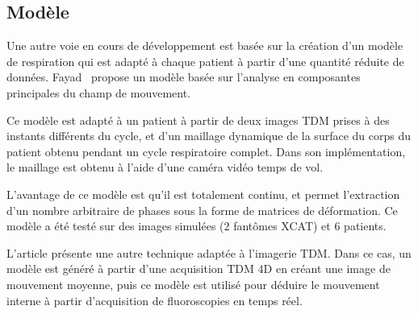 \subsection{Modèle}

Une autre voie en cours de développement est basée sur la création d'un modèle de respiration qui est adapté à chaque patient à partir d'une quantité réduite de données. Fayad~\cite{fayad2010application} propose un modèle basée sur l'analyse en composantes principales du champ de mouvement. 

Ce modèle est adapté à un patient à partir de deux images TDM prises à des instants différents du cycle, et d'un maillage dynamique de la surface du corps du patient obtenu pendant un cycle respiratoire complet. Dans son implémentation, le maillage est obtenu à l'aide d'une caméra vidéo temps de vol.

L'avantage de ce modèle est qu'il est totalement continu, et permet l'extraction d'un nombre arbitraire de phases sous la forme de matrices de déformation. Ce modèle a été testé sur des images simulées (2 fantômes XCAT) et 6 patients.

L'article \cite{vandemeulebroucke2009respiratory} présente une autre technique adaptée à l'imagerie TDM. Dans ce cas, un modèle est généré à partir d'une acquisition TDM 4D en créant une image de mouvement moyenne, puis ce modèle est utilisé pour déduire le mouvement interne à partir d'acquisition de fluoroscopies en temps réel.